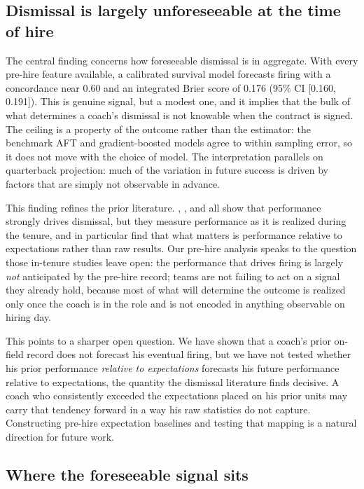 \documentclass[USenglish]{article}
\theoremstyle{dgthm}
\theoremstyle{dgdef}
\begin{document}
\subsection{Dismissal is largely unforeseeable at the time of hire}

The central finding concerns how foreseeable dismissal is in aggregate. With every pre-hire feature available, a calibrated survival model forecasts firing with a concordance near 0.60 and an integrated Brier score of 0.176 (95\% CI [0.160, 0.191]). This is genuine signal, but a modest one, and it implies that the bulk of what determines a coach's dismissal is not knowable when the contract is signed. The ceiling is a property of the outcome rather than the estimator: the benchmark AFT and gradient-boosted models agree to within sampling error, so it does not move with the choice of model. The interpretation parallels \citet{wolfson2011} on quarterback projection: much of the variation in future success is driven by factors that are simply not observable in advance.

This finding refines the prior literature. \citet{allen2012}, \citet{salaga2020}, and \citet{foreman2019} all show that performance strongly drives dismissal, but they measure performance as it is realized during the tenure, and \citet{allen2012} in particular find that what matters is performance relative to expectations rather than raw results. Our pre-hire analysis speaks to the question those in-tenure studies leave open: the performance that drives firing is largely \emph{not} anticipated by the pre-hire record; teams are not failing to act on a signal they already hold, because most of what will determine the outcome is realized only once the coach is in the role and is not encoded in anything observable on hiring day.

This points to a sharper open question. We have shown that a coach's prior on-field record does not forecast his eventual firing, but we have not tested whether his prior performance \emph{relative to expectations} forecasts his future performance relative to expectations, the quantity the dismissal literature finds decisive. A coach who consistently exceeded the expectations placed on his prior units may carry that tendency forward in a way his raw statistics do not capture. Constructing pre-hire expectation baselines and testing that mapping is a natural direction for future work.

\subsection{Where the foreseeable signal sits}
\end{document}
